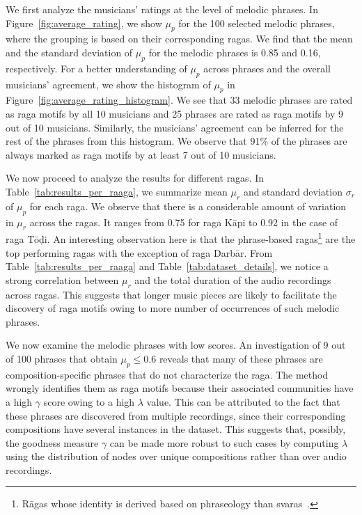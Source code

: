 We first analyze the musicians' ratings at the level of melodic phrases. In Figure~\ref{fig:average_rating}, we show $\mu_p$ for the 100 selected melodic phrases, where the grouping is based on their corresponding \glspl{raga}. We find that the mean and the standard deviation of $\mu_p$ for the melodic phrases is 0.85 and 0.16, respectively. For a better understanding of $\mu_p$ across phrases and the overall musicians' agreement, we show the histogram of $\mu_p$ in Figure~\ref{fig:average_rating_histogram}. We see that 33 melodic phrases are rated as \gls{raga} motifs by all 10 musicians and 25 phrases are rated as \gls{raga} motifs by 9 out of 10 musicians. Similarly, the musicians' agreement can be inferred for the rest of the phrases from this histogram. We observe that 91\% of the phrases are always marked as \gls{raga} motifs by at least 7 out of 10 musicians. 


We now proceed to analyze the results for different \glspl{raga}. In Table~\ref{tab:results_per_raaga}, we summarize mean $\mu_r$ and standard deviation $\sigma_r$ of $\mu_p$ for each \gls{raga}. We observe that there is a considerable amount of variation in $\mu_r$ across the \glspl{raga}. It ranges from 0.75 for \gls{raga} K\={a}pi to 0.92 in the case of \gls{raga} T\={o}\d{d}i. An interesting observation here is that the phrase-based \glspl{raga}\footnote{R\={a}gas whose identity is derived based on phraseology than svaras~\cite{krishna2012carnatic}.} are the top performing \glspl{raga} with the  exception of \gls{raga} Darb\={a}r. From Table~\ref{tab:results_per_raaga} and Table~\ref{tab:dataset_details}, we notice a strong correlation between $\mu_r$ and the total duration of the audio recordings across \glspl{raga}. This suggests that longer music pieces are likely to facilitate the discovery of \gls{raga} motifs owing to more number of occurrences of such melodic phrases.

We now examine the melodic phrases with low scores. An investigation of 9 out of 100 phrases that obtain $\mu_p\leq0.6$ reveals that many of these phrases are composition-specific phrases that do not characterize the \gls{raga}. The method wrongly identifies them as \gls{raga} motifs because their associated communities have a high $\gamma$ score owing to a high $\lambda$ value. This can be attributed to the fact that these phrases are discovered from multiple recordings, since their corresponding compositions have several instances in the dataset.  This suggests that, possibly, the goodness measure $\gamma$ can be made more robust to such cases by computing $\lambda$ using the distribution of nodes over unique compositions rather than over audio recordings.

